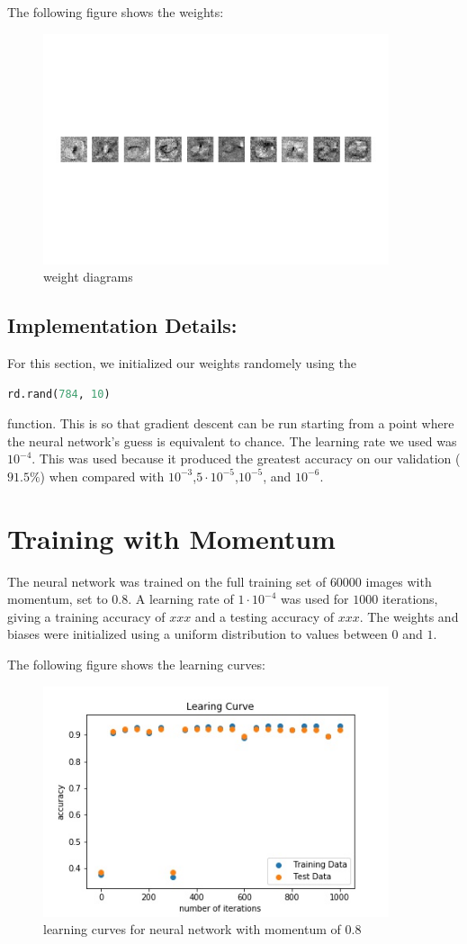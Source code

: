 \documentclass{article}
\begin{document}
  The following figure shows the weights:
  \begin{figure}[H] \centering
      \includegraphics[width=4in]{resources/weights}
      \caption{weight diagrams }
   \end{figure}


  \subsection {Implementation Details:} 
  For this section, we initialized our weights randomely using the 
 \begin{lstlisting}[language=Python]
  	rd.rand(784, 10) 
\end{lstlisting}
 function.
  This is so that gradient descent can be run starting from a point where the neural network's guess is equivalent to chance.
  The learning rate we used was $10^{-4}$. This was used because it produced the greatest accuracy on our validation ($91.5\%$) when compared with
  $10^{-3}$,$5 \cdot 10^{-5}$,$10^{-5}$, and $10^{-6}$. 




   \section{Training with Momentum}
   The neural network was trained on the full training set of $60000$ images with momentum, set to $0.8$.
   A learning rate of $1 \cdot 10^{-4}$ was used for $1000$ iterations, giving a training accuracy of $xxx$
   and a testing accuracy of $xxx$.
   The weights and biases were initialized using a uniform distribution to values between $0$ and $1$.

   The following figure shows the learning curves:
 \begin{figure}[H] \centering
      \includegraphics[width=4in]{resources/part5}
      \caption{learning curves for neural network  with momentum of 0.8}
   \end{figure}
\end{document}
